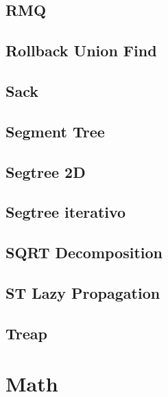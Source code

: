 \subsection{RMQ}
\raggedbottom
\hrulefill
\subsection{Rollback Union Find}
\raggedbottom
\hrulefill
\subsection{Sack}
\raggedbottom
\hrulefill
\subsection{Segment Tree}
\raggedbottom
\hrulefill
\subsection{Segtree 2D}
\raggedbottom
\hrulefill
\subsection{Segtree iterativo}
\raggedbottom
\hrulefill
\subsection{SQRT Decomposition}
\raggedbottom
\hrulefill
\subsection{ST Lazy Propagation}
\raggedbottom
\hrulefill
\subsection{Treap}
\raggedbottom
\hrulefill

\section{Math}
